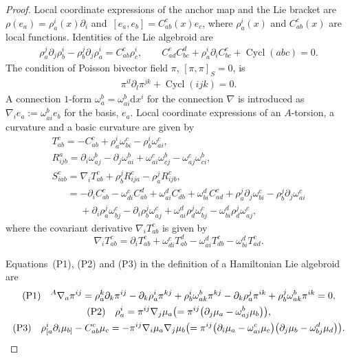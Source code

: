 \documentclass[10pt,a4paper]{amsart}
\numberwithin{equation}{section}
\newcommand{\rd}{\mathrm{d}}
\begin{document}
\begin{proof}
Local coordinate expressions of the anchor map and the Lie bracket are
$\rho(e_a)= \rho^i_a(x) \partial_i$ and~${[e_a, e_b ] = C_{ab}^c(x) e_c}$, where $\rho^i_a(x)$ and $C_{ab}^c(x)$
are local functions.
Identities of the Lie algebroid are
\begin{gather}%
 \rho_a^j \partial_j \rho_{b}^i - \rho_b^j \partial_j \rho_{a}^i = C_{ab}^c \rho_c^i,
\qquad
 C_{ad}^e C_{bc}^d + \rho_a^i \partial_i C_{bc}^e + \operatorname{Cycl}(abc) = 0.\label{LAidentity1}
\end{gather}
The condition of Poisson bivector field $\pi$, $[\pi, \pi]_S=0$, is
\begin{gather}
 \pi^{il} \partial_l \pi^{jk} + \operatorname{Cycl}(ijk) = 0.
\label{Poissonidentity}
\end{gather}
A connection $1$-form $\omega_a^b = \omega_{ai}^b \rd x^i$
for the connection $\nabla$ is introduced as
$\nabla_i e_a := \omega_{ai}^b e_b$ for the basis, $e_a$.
Local coordinate expressions of an $A$-torsion,
a curvature and a basic curvature are given by
\begin{gather}%
T_{ab}^c =
- C_{ab}^c + \rho_a^i \omega_{bi}^c - \rho_b^i \omega_{ai}^c,
\label{lcAtosion}
\\
R_{ijb}^a =
\partial_i \omega_{aj}^b - \partial_j \omega_{ai}^b
+ \omega_{ai}^c \omega_{cj}^b - \omega_{aj}^c \omega_{ci}^b,
\nonumber
\\
S_{iab}^{c} =
\nabla_i T_{ab}^c + \rho_b^j R_{ija}^c - \rho_a^j R_{ijb}^c,
 \nonumber \\
\phantom{S_{iab}^{c} }{}= - \partial_i C^c_{ab} - \omega_{di}^c C_{ab}^d
+ \omega_{ai}^d C_{db}^c + \omega_{bi}^d C_{ad}^c
+ \rho_a^j \partial_j \omega_{bi}^c
- \rho_b^j \partial_j \omega_{ai}^c
\nonumber \\
\phantom{S_{iab}^{c} =}{}+ \partial_i \rho_a^j \omega_{bj}^c
- \partial_i \rho_b^j \omega_{aj}^c
+ \omega_{ai}^d \rho_d^j \omega_{bj} ^c
- \omega_{bi}^d \rho_d^j \omega_{aj} ^c,
\label{lcbasiccurv}
\end{gather}
where the covariant derivative $\nabla_i T_{ab}^c$ is given by
\[
\nabla_i T_{ab}^c =
\partial_i T_{ab}^c
+ \omega_{di}^c T_{ab}^d - \omega_{ai}^d T_{db}^c - \omega_{bi}^d T_{ad}^c.
\]

Equations~(P1), (P2) and (P3) in the definition of a Hamiltonian Lie algebroid are
\begin{gather}
{\rm (P1)} \quad {}^A \nabla_a \pi^{ij}
= \rho_a^k \partial_k \pi^{ij} - \partial_k \rho^i_a \pi^{kj}
+ \rho^i_b \omega^b_{ak} \pi^{kj}
- \partial_k \rho^j_a \pi^{ik}
+ \rho^j_b \omega^b_{ak} \pi^{ik} = 0,\nonumber\\
{\rm (P2)} \quad
\rho^i_a = \pi^{ij} \nabla_j \mu_a
\bigl(= \pi^{ij} \bigl(\partial_j \mu_a - \omega_{aj}^b \mu_b\bigr)\bigr),
\label{Pms12}\\
{\rm (P3)}\quad
\rho^i_{[a} \partial_i \mu_{b]} - C_{ab}^c \mu_c
= - \pi^{ij} \nabla_i \mu_a \nabla_j \mu_b
\bigl(= \pi^{ij} \bigl(\partial_i \mu_a - \omega_{ai}^c \mu_c\bigr)
\bigl(\partial_j \mu_b - \omega_{bj}^d \mu_d\bigr)\bigr).
\label{Pms13}
\end{gather}


\end{proof}
\end{document}
